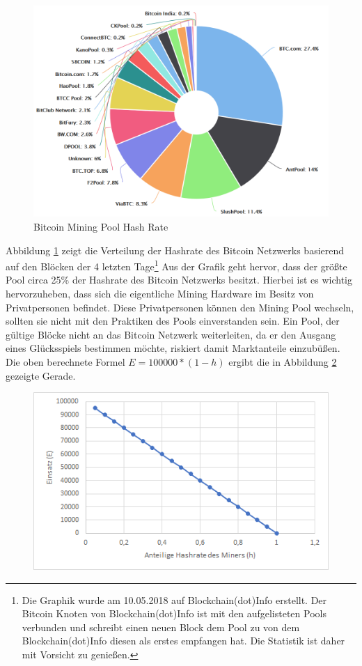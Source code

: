 \begin{figure}[H]
\centering
\includegraphics[width=1\linewidth]{Figures/btc_mining_pools}
\decoRule
\caption{Bitcoin Mining Pool Hash Rate \cite{blockchain_info_pools}}
\label{fig:btc_mining_pools}
\end{figure}

Abbildung \ref{fig:btc_mining_pools} zeigt die Verteilung der Hashrate des Bitcoin Netzwerks basierend auf den Blöcken der 4 letzten Tage\footnote{Die Graphik wurde am 10.05.2018 auf Blockchain(dot)Info erstellt. Der Bitcoin Knoten von Blockchain(dot)Info ist mit den aufgelisteten Pools verbunden und schreibt einen neuen Block dem Pool zu von dem Blockchain(dot)Info diesen als erstes empfangen hat. Die Statistik ist daher mit Vorsicht zu genießen.} Aus der Grafik geht hervor, dass der größte Pool circa 25\% der Hashrate des Bitcoin Netzwerks besitzt. Hierbei ist es wichtig hervorzuheben, dass sich die eigentliche Mining Hardware im Besitz von Privatpersonen befindet. Diese Privatpersonen können den Mining Pool wechseln, sollten sie nicht mit den Praktiken des Pools einverstanden sein. Ein Pool, der gültige Blöcke nicht an das Bitcoin Netzwerk weiterleiten, da er den Ausgang eines Glücksspiels bestimmen möchte, riskiert damit Marktanteile einzubüßen.
\newpage
\noindent
Die oben berechnete Formel $E = 100000 * (1-h)$ ergibt die in Abbildung \ref{fig:eH} gezeigte Gerade.

\begin{figure}[H]
\centering
\includegraphics[width=1\linewidth]{Figures/hE}
\decoRule
\caption{}
\label{fig:eH}
\end{figure}


